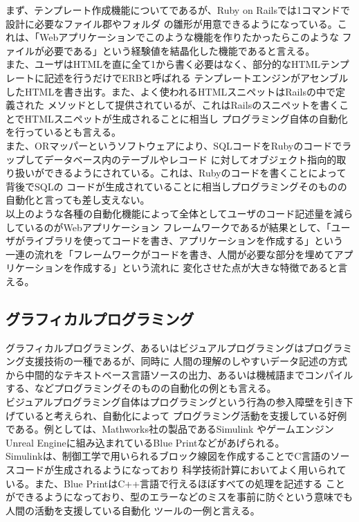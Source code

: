 \documentclass[10pt,a4paper]{ltjsarticle}       %
\begin{document}
まず、テンプレート作成機能についてであるが、Ruby on Railsでは1コマンドで設計に必要なファイル郡やフォルダ
の雛形が用意できるようになっている。これは、「Webアプリケーションでこのような機能を作りたかったらこのような
ファイルが必要である」という経験値を結晶化した機能であると言える。\\
また、ユーザはHTMLを直に全て1から書く必要はなく、部分的なHTMLテンプレートに記述を行うだけでERBと呼ばれる
テンプレートエンジンがアセンブルしたHTMLを書き出す。また、よく使われるHTMLスニペットはRailsの中で定義された
メソッドとして提供されているが、これはRailsのスニペットを書くことでHTMLスニペットが生成されることに相当し
プログラミング自体の自動化を行っているとも言える。\\
また、ORマッパーというソフトウェアにより、SQLコードをRubyのコードでラップしてデータベース内のテーブルやレコード
に対してオブジェクト指向的取り扱いができるようにされている。これは、Rubyのコードを書くことによって背後でSQLの
コードが生成されていることに相当しプログラミングそのものの自動化と言っても差し支えない。\\

以上のような各種の自動化機能によって全体としてユーザのコード記述量を減らしているのがWebアプリケーション
フレームワークであるが結果として、「ユーザがライブラリを使ってコードを書き、アプリケーションを作成する」という
一連の流れを「フレームワークがコードを書き、人間が必要な部分を埋めてアプリケーションを作成する」という流れに
変化させた点が大きな特徴であると言える。
\subsection{グラフィカルプログラミング}
グラフィカルプログラミング、あるいはビジュアルプログラミングはプログラミング支援技術の一種であるが、同時に
人間の理解のしやすいデータ記述の方式から中間的なテキストベース言語ソースの出力、あるいは機械語までコンパイル
する、などプログラミングそのものの自動化の例とも言える。\\

ビジュアルプログラミング自体はプログラミングという行為の参入障壁を引き下げていると考えられ、自動化によって
プログラミング活動を支援している好例である。例としては、Mathworks社の製品であるSimulink\cite{simulink}
やゲームエンジンUnreal Engineに組み込まれているBlue Print\cite{blueprint}などがあげられる。\\
Simulinkは、制御工学で用いられるブロック線図を作成することでC言語のソースコードが生成されるようになっており
科学技術計算においてよく用いられている。また、Blue PrintはC++言語で行えるほぼすべての処理を記述する
ことができるようになっており、型のエラーなどのミスを事前に防ぐという意味でも人間の活動を支援している自動化
ツールの一例と言える。
\end{document}
